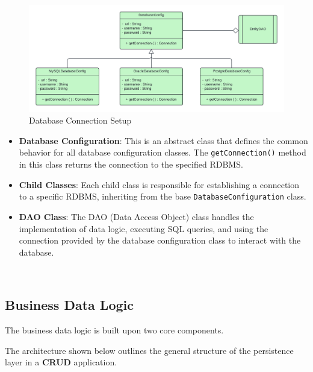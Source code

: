 \documentclass{article}
\begin{document}
\begin{figure}[H]
    \centering
    \begin{framed}
        \includegraphics[width=0.8\linewidth]{images/jdbc_setup.png}
    \end{framed}
    \caption{Database Connection Setup}
    \label{fig:spring-logo}
\end{figure}


\begin{itemize}
    \item \textbf{Database Configuration}: This is an abstract class that defines the common behavior for all database configuration classes. The \texttt{getConnection()} method in this class returns the connection to the specified RDBMS.
    
    \item \textbf{Child Classes}: Each child class is responsible for establishing a connection to a specific RDBMS, inheriting from the base \texttt{DatabaseConfiguration} class.
    
    \item \textbf{DAO Class}: The DAO (Data Access Object) class handles the implementation of data logic, executing SQL queries, and using the connection provided by the database configuration class to interact with the database.
\end{itemize}

\\



\subsection{Business Data Logic}

The business data logic is built upon two core components. 

The architecture shown below outlines the general structure of the persistence layer in a \textbf{CRUD} application.
\end{document}
